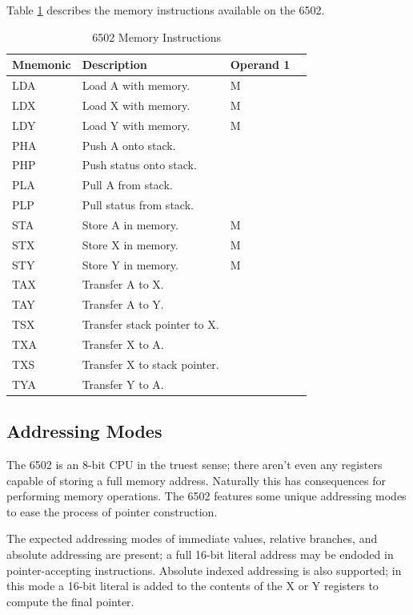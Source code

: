 \documentclass[journal]{IEEEtran}
\begin{document}
Table \ref{mem} describes the memory instructions available on the 6502.

\begin{table}
\centering
\begin{tabular}[H!]{|l|l|l|l|}
\hline
\textbf{Mnemonic} & \textbf{Description} & \textbf{Operand 1} \\
\hline
LDA & Load A with memory. & M \\
LDX & Load X with memory. & M \\
LDY & Load Y with memory. & M \\
PHA & Push A onto stack. & \\
PHP & Push status onto stack. & \\
PLA & Pull A from stack. & \\
PLP & Pull status from stack. & \\
STA & Store A in memory. & M \\
STX & Store X in memory. & M \\
STY & Store Y in memory. & M \\
TAX & Transfer A to X. & \\
TAY & Transfer A to Y. & \\
TSX & Transfer stack pointer to X. & \\
TXA & Transfer X to A. & \\
TXS & Transfer X to stack pointer. & \\
TYA & Transfer Y to A. & \\
\hline
\end{tabular}
\caption{6502 Memory Instructions}
\label{mem}
\end{table}

\subsection{Addressing Modes}

The 6502 is an 8-bit CPU in the truest sense; there aren't even any registers
capable of storing a full memory address. Naturally this has consequences for
performing memory operations. The 6502 features some unique addressing modes to
ease the process of pointer construction.

The expected addressing modes of immediate values, relative branches, and
absolute addressing are present; a full 16-bit literal address may be endoded
in pointer-accepting instructions. Absolute indexed addressing is also
supported; in this mode a 16-bit literal is added to the contents of the X or Y
registers to compute the final pointer.
\end{document}
